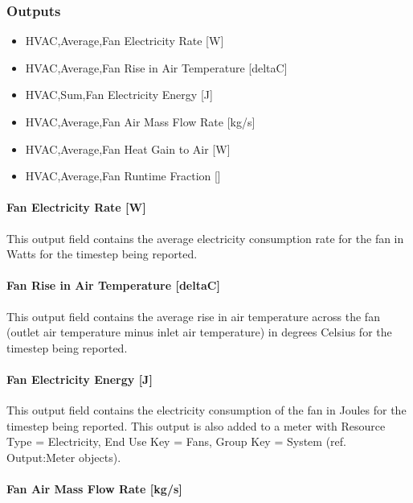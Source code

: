 \subsubsection{Outputs}\label{outputs-1-011}

\begin{itemize}
\item
  HVAC,Average,Fan Electricity Rate {[}W{]}
\item
  HVAC,Average,Fan Rise in Air Temperature {[}deltaC{]}
\item
  HVAC,Sum,Fan Electricity Energy {[}J{]}
\item
  HVAC,Average,Fan Air Mass Flow Rate {[}kg/s{]}
\item
  HVAC,Average,Fan Heat Gain to Air {[}W{]}
\item
  HVAC,Average,Fan Runtime Fraction {[]}
\end{itemize}

\paragraph{Fan Electricity Rate {[}W{]}}\label{fan-electric-power-w-1}

This output field contains the average electricity consumption rate for the fan in Watts for the timestep being reported.

\paragraph{Fan Rise in Air Temperature {[}deltaC{]}}\label{fan-rise-in-air-temperature-deltac-1}

This output field contains the average rise in air temperature across the fan (outlet air temperature minus inlet air temperature) in degrees Celsius for the timestep being reported.

\paragraph{Fan Electricity Energy {[}J{]}}\label{fan-electric-energy-j-1}

This output field contains the electricity consumption of the fan in Joules for the timestep being reported. This output is also added to a meter with Resource Type = Electricity, End Use Key = Fans, Group Key = System (ref. Output:Meter objects).

\paragraph{Fan Air Mass Flow Rate {[}kg/s{]}}\label{fan-air-mass-flow-kgs-1}

